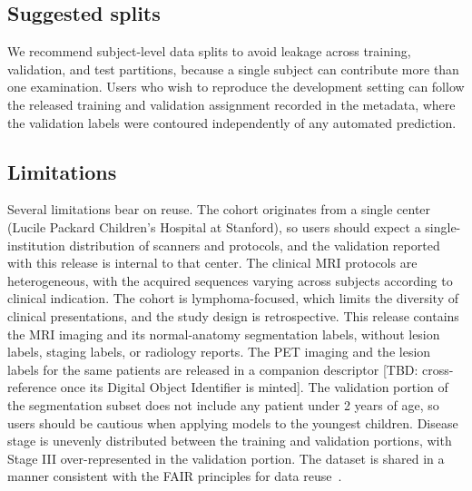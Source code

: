 \subsection*{Suggested splits}\label{subsec:splits}
We recommend subject-level data splits to avoid leakage across training, validation, and test partitions, because a single subject can contribute more than one examination.
Users who wish to reproduce the development setting can follow the released training and validation assignment recorded in the metadata, where the validation labels were contoured independently of any automated prediction.

\subsection*{Limitations}\label{subsec:limits}
Several limitations bear on reuse.
The cohort originates from a single center (Lucile Packard Children's Hospital at Stanford), so users should expect a single-institution distribution of scanners and protocols, and the validation reported with this release is internal to that center.
The clinical MRI protocols are heterogeneous, with the acquired sequences varying across subjects according to clinical indication.
The cohort is lymphoma-focused, which limits the diversity of clinical presentations, and the study design is retrospective.
This release contains the MRI imaging and its normal-anatomy segmentation labels, without lesion labels, staging labels, or radiology reports.
The PET imaging and the lesion labels for the same patients are released in a companion descriptor [TBD: cross-reference once its Digital Object Identifier is minted].
The validation portion of the segmentation subset does not include any patient under 2 years of age, so users should be cautious when applying models to the youngest children.
Disease stage is unevenly distributed between the training and validation portions, with Stage III over-represented in the validation portion.
The dataset is shared in a manner consistent with the FAIR principles for data reuse~\cite{Wilkinson_2016}.
